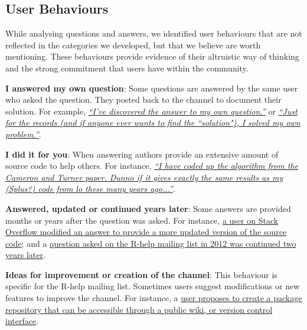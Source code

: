 \subsection{User Behaviours}
\label{sec:userbeh}

    While analysing questions and answers, we identified user behaviours that are not reflected in the categories we developed, but that we believe are worth mentioning.
    These behaviours provide evidence of their altruistic way of thinking and the strong commitment that users have within the community.
    \begin{packed_enum}
        \item \textbf{I answered my own question}: Some questions are answered by the same user who asked the question. They posted back to the channel to document their solution.
        For example, \textit{\href{http://goo.gl/FG59Mw}{``I've discovered the answer to my own question.''}} or \textit{\href{https://goo.gl/r3z0DX}{``Just for the records (and if anyone ever wants to find the ``solution"), I solved my own problem.''}}.

        \item \textbf{I did it for you}: When answering authors provide an extensive amount of source code to help others. For instance, \textit{\href{http://goo.gl/GXWGG3}{``I have coded up the algorithm from the Cameron and Turner paper. Dunno if it gives exactly the same results as my (Splus?) code from lo these many years ago...''}}.

        \item \textbf{Answered, updated or continued years later}: Some answers are provided months or years after the question was asked.
        For instance, \href{http://goo.gl/k6ZARR}{a user on Stack Overflow modified an answer to provide a more updated version of the source code}; and a \href{http://goo.gl/kgSHZv}{question asked on the R-help mailing list in 2012 was continued two years later}.

        \item \textbf{Ideas for improvement or creation of the channel}: This behaviour is specific for the R-help mailing list. Sometimes users suggest modifications or new features to improve the channel. For instance, a \href{http://goo.gl/p0IunD}{user proposes to create a package repository that can be accessible through a public wiki, or version control interface}.
    \end{packed_enum}

